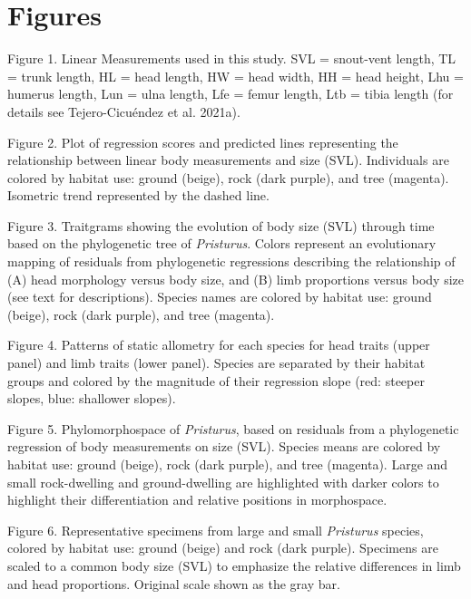 \documentclass[
  11pt,
]{article}
\begin{document}
\newpage

\hypertarget{figures}{%
\section{Figures}\label{figures}}

Figure 1. Linear Measurements used in this study. SVL = snout-vent
length, TL = trunk length, HL = head length, HW = head width, HH = head
height, Lhu = humerus length, Lun = ulna length, Lfe = femur length, Ltb
= tibia length (for details see Tejero-Cicuéndez et al. 2021a).

Figure 2. Plot of regression scores and predicted lines representing the
relationship between linear body measurements and size (SVL).
Individuals are colored by habitat use: ground (beige), rock (dark
purple), and tree (magenta). Isometric trend represented by the dashed
line.

Figure 3. Traitgrams showing the evolution of body size (SVL) through
time based on the phylogenetic tree of \emph{Pristurus}. Colors
represent an evolutionary mapping of residuals from phylogenetic
regressions describing the relationship of (A) head morphology versus
body size, and (B) limb proportions versus body size (see text for
descriptions). Species names are colored by habitat use: ground (beige),
rock (dark purple), and tree (magenta).

Figure 4. Patterns of static allometry for each species for head traits
(upper panel) and limb traits (lower panel). Species are separated by
their habitat groups and colored by the magnitude of their regression
slope (red: steeper slopes, blue: shallower slopes).

Figure 5. Phylomorphospace of \emph{Pristurus}, based on residuals from
a phylogenetic regression of body measurements on size (SVL). Species
means are colored by habitat use: ground (beige), rock (dark purple),
and tree (magenta). Large and small rock-dwelling and ground-dwelling
are highlighted with darker colors to highlight their differentiation
and relative positions in morphospace.

Figure 6. Representative specimens from large and small
\textit{Pristurus} species, colored by habitat use: ground (beige) and
rock (dark purple). Specimens are scaled to a common body size (SVL) to
emphasize the relative differences in limb and head proportions.
Original scale shown as the gray bar.

\newpage
\end{document}
